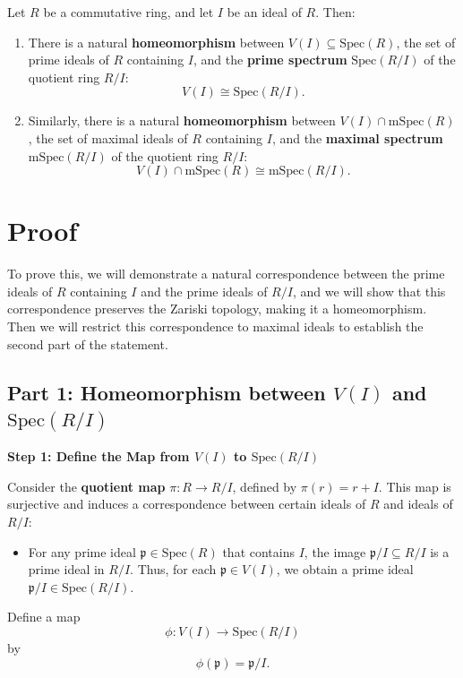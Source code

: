 \documentclass[11pt,openany]{article}
\begin{document}
Let \( R \) be a commutative ring, and let \( I \) be an ideal of \( R \). Then:
\begin{enumerate}
	\item There is a natural \textbf{homeomorphism} between \( V(I) \subseteq \text{Spec}(R) \), the set of prime ideals of \( R \) containing \( I \), and the \textbf{prime spectrum} \( \text{Spec}(R/I) \) of the quotient ring \( R/I \):
	\[
	V(I) \cong \text{Spec}(R/I).
	\]
	\item Similarly, there is a natural \textbf{homeomorphism} between \( V(I) \cap \text{mSpec}(R) \), the set of maximal ideals of \( R \) containing \( I \), and the \textbf{maximal spectrum} \( \text{mSpec}(R/I) \) of the quotient ring \( R/I \):
	\[
	V(I) \cap \text{mSpec}(R) \cong \text{mSpec}(R/I).
	\]
\end{enumerate}

\section*{Proof}

To prove this, we will demonstrate a natural correspondence between the prime ideals of \( R \) containing \( I \) and the prime ideals of \( R/I \), and we will show that this correspondence preserves the Zariski topology, making it a homeomorphism. Then we will restrict this correspondence to maximal ideals to establish the second part of the statement.

\subsection*{Part 1: Homeomorphism between \( V(I) \) and \( \text{Spec}(R/I) \)}

\textbf{Step 1: Define the Map from \( V(I) \) to \( \text{Spec}(R/I) \)}

Consider the \textbf{quotient map} \( \pi: R \to R/I \), defined by \( \pi(r) = r + I \). This map is surjective and induces a correspondence between certain ideals of \( R \) and ideals of \( R/I \):
\begin{itemize}
	\item For any prime ideal \( \mathfrak{p} \in \text{Spec}(R) \) that contains \( I \), the image \( \mathfrak{p}/I \subseteq R/I \) is a prime ideal in \( R/I \). Thus, for each \( \mathfrak{p} \in V(I) \), we obtain a prime ideal \( \mathfrak{p}/I \in \text{Spec}(R/I) \).
\end{itemize}

Define a map
\[
\phi: V(I) \to \text{Spec}(R/I)
\]
by
\[
\phi(\mathfrak{p}) = \mathfrak{p}/I.
\]
\end{document}
